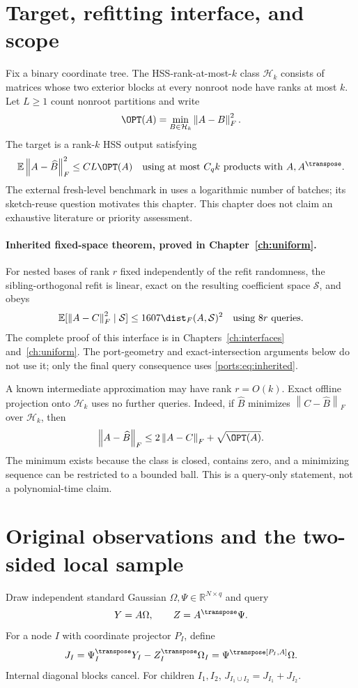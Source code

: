 \documentclass[11pt,oneside,openany,a4paper]{book}
\numberwithin{equation}{chapter}
\theoremstyle{definition}
\theoremstyle{remark}
\newcommand{\R}{\mathbb R}\newcommand{\E}{\mathbb E}\newcommand{\Prb}{\mathbb P}\newcommand{\PP}{\mathbb P}
\newcommand{\F}[1]{\left\lVert#1\right\rVert_F}
\newcommand{\HH}{\mathcal H}\newcommand{\SSS}{\mathcal S}
\begin{document}
\section{Target, refitting interface, and scope}
Fix a binary coordinate tree. The HSS-rank-at-most-$k$ class $\HH_k$ consists of matrices whose two exterior blocks at every nonroot node have ranks at most $k$. Let $L\ge1$ count nonroot partitions and write
\[
 \OPT(A)=\min_{B\in\HH_k}\F{A-B}^2.
\]
The target is a rank-$k$ HSS output satisfying
\begin{equation}\label{ports:eq:target}
 \E\F{A-\widehat B}^2\le C L\OPT(A)
 \quad\text{using at most }C_q k\text{ products with }A,A^\transpose.
\end{equation}
The external fresh-level benchmark in \cite{AmselHSS} uses a logarithmic number of batches; its sketch-reuse question motivates this chapter. This chapter does not claim an exhaustive literature or priority assessment.

\paragraph{Inherited fixed-space theorem, proved in Chapter~\ref{ch:uniform}.}
For nested bases of rank $r$ fixed independently of the refit randomness, the sibling-orthogonal refit is linear, exact on the resulting coefficient space $\SSS$, and obeys
\begin{equation}\label{ports:eq:inherited}
 \E[\F{A-C}^2\mid\SSS]\le1607\dist_F(A,\SSS)^2
 \quad\text{using }8r\text{ queries}.
\end{equation}
The complete proof of this interface is in Chapters~\ref{ch:interfaces} and~\ref{ch:uniform}. The port-geometry and exact-intersection arguments below do not use it; only the final query consequence uses \eqref{ports:eq:inherited}.

A known intermediate approximation may have rank $r=O(k)$. Exact offline projection onto $\HH_k$ uses no further queries. Indeed, if $\widehat B$ minimizes $\F{C-\widehat B}$ over $\HH_k$, then
\begin{equation}\label{ports:eq:offline}
 \F{A-\widehat B}\le2\F{A-C}+\sqrt{\OPT(A)}.
\end{equation}
The minimum exists because the class is closed, contains zero, and a minimizing sequence can be restricted to a bounded ball. This is a query-only statement, not a polynomial-time claim.

\section{Original observations and the two-sided local sample}
Draw independent standard Gaussian $\Omega,\Psi\in\R^{N\times q}$ and query
\[
 Y=A\Omega,\qquad Z=A^\transpose\Psi.
\]
For a node $I$ with coordinate projector $P_I$, define
\begin{equation}\label{ports:eq:J}
 J_I=\Psi_I^\transpose Y_I-Z_I^\transpose\Omega_I
     =\Psi^\transpose[P_I,A]\Omega.
\end{equation}
Internal diagonal blocks cancel. For children $I_1,I_2$,
$J_{I_1\cup I_2}=J_{I_1}+J_{I_2}$.
\end{document}
